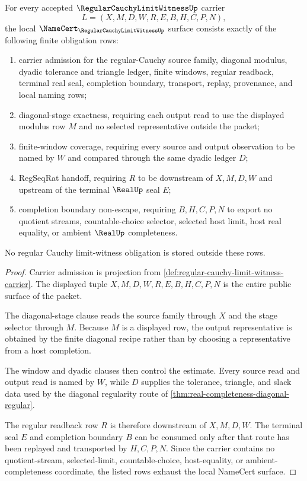 \begin{theorem}
\label{thm:regular-cauchy-limit-witness-namecert-obligations}
For every accepted $\RegularCauchyLimitWitnessUp$ carrier
$$
L=(X,M,D,W,R,E,B,H,C,P,N),
$$
the local $\NameCert_{\RegularCauchyLimitWitnessUp}$ surface consists exactly of the following finite obligation rows:
\begin{enumerate}
\item carrier admission for the regular-Cauchy source family, diagonal modulus, dyadic tolerance and triangle ledger, finite windows, regular readback, terminal real seal, completion boundary, transport, replay, provenance, and local naming rows;
\item diagonal-stage exactness, requiring each output read to use the displayed modulus row $M$ and no selected representative outside the packet;
\item finite-window coverage, requiring every source and output observation to be named by $W$ and compared through the same dyadic ledger $D$;
\item RegSeqRat handoff, requiring $R$ to be downstream of $X,M,D,W$ and upstream of the terminal $\RealUp$ seal $E$;
\item completion boundary non-escape, requiring $B,H,C,P,N$ to export no quotient streams, countable-choice selector, selected host limit, host real equality, or ambient $\RealUp$ completeness.
\end{enumerate}
No regular Cauchy limit-witness obligation is stored outside these rows.
\end{theorem}
\begin{proof}
Carrier admission is projection from \autoref{def:regular-cauchy-limit-witness-carrier}. The displayed tuple $X,M,D,W,R,E,B,H,C,P,N$ is the entire public surface of the packet.

The diagonal-stage clause reads the source family through $X$ and the stage selector through $M$. Because $M$ is a displayed row, the output representative is obtained by the finite diagonal recipe rather than by choosing a representative from a host completion.

The window and dyadic clauses then control the estimate. Every source read and output read is named by $W$, while $D$ supplies the tolerance, triangle, and slack data used by the diagonal regularity route of \autoref{thm:real-completeness-diagonal-regular}.

The regular readback row $R$ is therefore downstream of $X,M,D,W$. The terminal seal $E$ and completion boundary $B$ can be consumed only after that route has been replayed and transported by $H,C,P,N$. Since the carrier contains no quotient-stream, selected-limit, countable-choice, host-equality, or ambient-completeness coordinate, the listed rows exhaust the local NameCert surface.
\end{proof}

